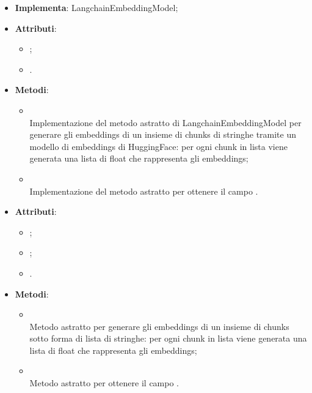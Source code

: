 \documentclass[10pt, a4paper]{article}
\begin{document}
\label{HuggingFaceEmbeddingModelDettaglio}
\begin{itemize}
    \item \textbf{Implementa}: LangchainEmbeddingModel;
    \item \textbf{Attributi}:
    \begin{itemize}
        \item {};
        \item {}.
    \end{itemize}
    \item \textbf{Metodi}:
    \begin{itemize}
        \item {}\\
        Implementazione del metodo astratto di LangchainEmbeddingModel per generare gli embeddings di un insieme di chunks di stringhe tramite un modello di embeddings di HuggingFace: per ogni chunk in lista viene generata una lista di float che rappresenta gli embeddings;
        \item {}\\
        Implementazione del metodo astratto per ottenere il campo .
    \end{itemize}
\end{itemize}


\label{LangchainDocumentDettaglio}
\begin{itemize}
    \item \textbf{Attributi}:
    \begin{itemize}
        \item {};
        \item {};
        \item {}.
    \end{itemize}
\end{itemize}

\label{LangchainEmbeddingModelDettaglio}
\begin{itemize}
    \item \textbf{Metodi}:
    \begin{itemize}
        \item {}\\
        Metodo astratto per generare gli embeddings di un insieme di chunks sotto forma di lista di stringhe: per ogni chunk in lista viene generata una lista di float che rappresenta gli embeddings;
        \item {}\\
        Metodo astratto per ottenere il campo .
    \end{itemize}
\end{itemize}
\end{document}
